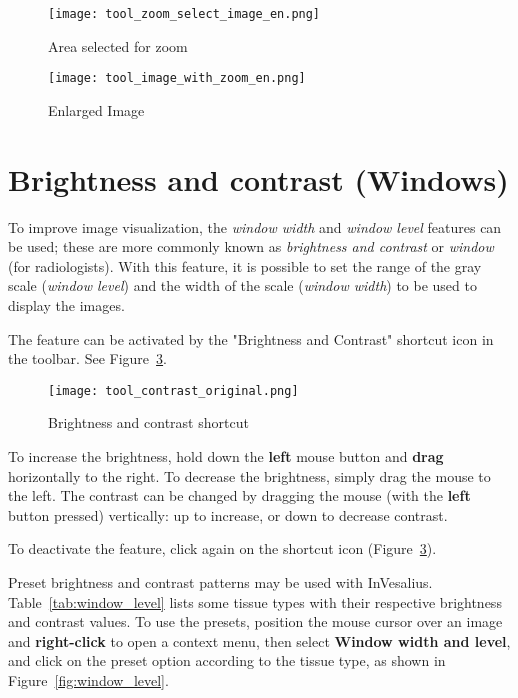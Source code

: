 \begin{figure}[!htb]
\centering
\texttt{[image: tool\_zoom\_select\_image\_en.png]}
\caption{Area selected for zoom}
\label{fig:zoom_select}
\end{figure}

\begin{figure}[!htb]
\centering
\texttt{[image: tool\_image\_with\_zoom\_en.png]}
\caption{Enlarged Image}
\label{fig:zoom_applied}
\end{figure}


\section{Brightness and contrast (Windows)}
\label{sec:ww_wl}

To improve image visualization, the \textit{window width} and \textit{window level} features can be used; these are more commonly known as \textit{brightness and contrast} or \textit{window} (for radiologists). With this feature, it is possible to set the range of the gray scale (\textit{window level}) and the width of the scale (\textit{window width}) to be used to display the images.

The feature can be activated by the "Brightness and Contrast" shortcut icon in the toolbar. See Figure~\ref{fig:window_level_shortcut}.

\begin{figure}[!htb]
\centering
\texttt{[image: tool\_contrast\_original.png]}
\caption{Brightness and contrast shortcut}
\label{fig:window_level_shortcut}
\end{figure}

To increase the brightness, hold down the \textbf{left} mouse button and \textbf{drag} horizontally to the right. To decrease the brightness, simply drag the mouse to the left. The contrast can be changed by dragging the mouse (with the \textbf{left} button pressed) vertically: up to increase, or down to decrease contrast.

To deactivate the feature, click again on the shortcut icon (Figure~\ref{fig:window_level_shortcut}).

Preset brightness and contrast patterns may be used with InVesalius. Table~\ref{tab:window_level} lists some tissue types with their respective brightness and contrast values. To use the presets, position the mouse cursor over an image and \textbf{right-click} to open a context menu, then select \textbf{Window width and level}, and click on the preset option according to the tissue type, as shown in Figure~\ref{fig:window_level}.

